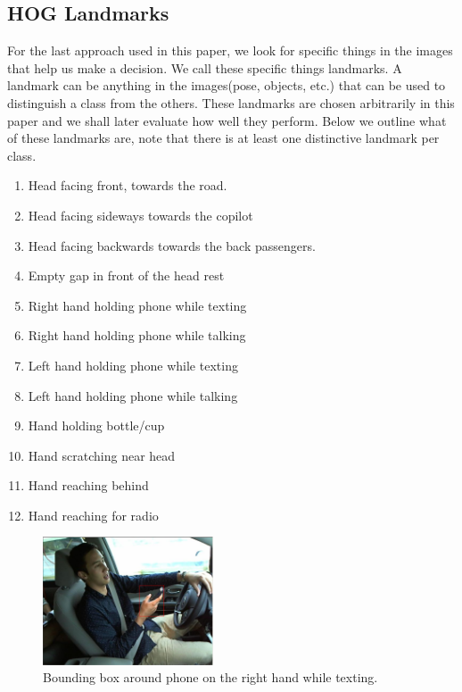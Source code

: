 \documentclass[10pt,twocolumn,letterpaper]{article}
\begin{document}
\subsection{HOG Landmarks}

For the last approach used in this paper, we look for specific things in the images that help us make a decision. We call these specific things landmarks. A landmark can be anything in the images(pose, objects, etc.) that can be used to distinguish a class from the others. These landmarks are chosen arbitrarily in this paper and we shall later evaluate how well they perform. Below we outline what of these landmarks are, note that there is at least one distinctive landmark per class.

\begin{enumerate}
	\item Head facing front, towards the road.
	\item Head facing sideways towards the copilot
	\item Head facing backwards towards the back passengers.
	\item Empty gap in front of the head rest
	\item Right hand holding phone while texting
	\item Right hand holding phone while talking\
	\item Left hand holding phone while texting
	\item Left hand holding phone while talking
	\item Hand holding bottle/cup
	\item Hand scratching near head
	\item Hand reaching behind
	\item Hand reaching for radio	
\end{enumerate}


\begin{figure}[h]
	\centering
	\includegraphics[width=0.45\textwidth]{mult_HOG/HOG_phone_det}%
	\caption{Bounding box around phone on the right hand while texting. }
	\label{HoG_phone_det}
\end{figure}
\end{document}
